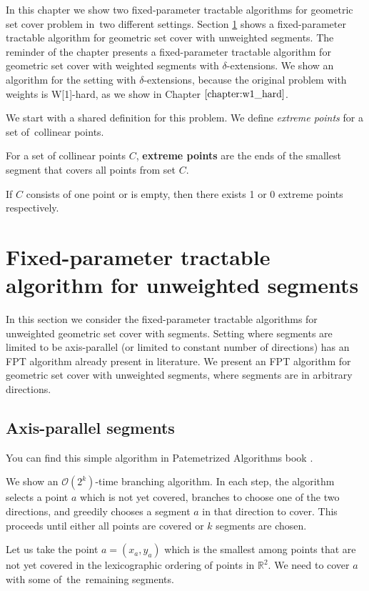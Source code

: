In this chapter we show two fixed-parameter tractable algorithms
for geometric set cover problem in~two different settings.
Section \ref{section:fpt_unweighted} shows 
a fixed-parameter tractable algorithm for geometric set cover with unweighted segments.
The reminder of the chapter presents
a fixed-parameter tractable algorithm for geometric set cover with weighted segments
with $\delta$-extensions.
We show an algorithm for the setting with $\delta$-extensions,
because the original problem with weights is W[1]-hard,
as we show in Chapter $\ref{chapter:w1_hard}$.

We start with a shared definition for this problem.
We define \textit{extreme points} for a set of~collinear points.

\begin{defi}
	For a set of collinear points $C$,
	\textbf{extreme points} are the ends
	of the smallest segment that covers all points from set $C$.
	
	If $C$ consists of one point or is empty, then
	there exists 1 or 0 extreme points respectively.
\end{defi}

\section{Fixed-parameter tractable algorithm for unweighted segments}
\label{section:fpt_unweighted}
In this section we consider the fixed-parameter tractable
algorithms for unweighted geometric set cover with segments.
Setting where segments are limited to be axis-parallel
(or limited to constant number of directions) has an FPT
algorithm already present in literature.
We present an FPT algorithm for geometric set cover
with unweighted segments, where segments are in arbitrary directions.

\subsection{Axis-parallel segments}
You can find this simple algorithm in Patemetrized Algorithms book \cite{platypus_book}.

We show an $\mathcal{O}(2^k)$-time branching algorithm.
In each step, the algorithm selects a point $a$ which is not yet covered,
branches to choose one of the two directions, and greedily chooses
a segment $a$ in that direction to cover.
This proceeds until either all points are covered or $k$ segments are chosen.

Let us take
the point $a=(x_a,y_a)$ which is the smallest 
among points that are not yet covered
in the lexicographic ordering
of points in $\mathbb{R}^2$.
We need to cover $a$ with some of~the~remaining segments.

